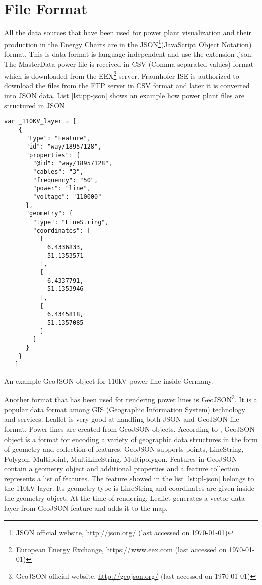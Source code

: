 \section{File Format}
\label{sec:fileFormat}

All the data sources that have been used for power plant visualization and their production in the Energy Charts are in the JSON\footnote{JSON official website, \url{http://json.org/} (last accessed on {\today})}(JavaScript Object Notation) format. This is data format is language-independent and use the extension .json. The MasterData power file is received in CSV (Comma-separated values) format which is downloaded from the EEX\footnote{European Energy Exchange, \url{https://www.eex.com} (last accessed on {\today})} server. Fraunhofer ISE is authorized to download the files from the FTP server in CSV format and later it is converted into JSON data. List \ref{lst:pp-json} shows an example how power plant files are structured in JSON. 

\begin{Listing}
\begin{lstlisting}
var _110KV_layer = [
    {
      "type": "Feature",
      "id": "way/18957128",
      "properties": {
        "@id": "way/18957128",
        "cables": "3",
        "frequency": "50",
        "power": "line",
        "voltage": "110000"
      },
      "geometry": {
        "type": "LineString",
        "coordinates": [
          [
            6.4336833,
            51.1353571
          ],
          [
            6.4337791,
            51.1353946
          ],
          [
            6.4345818,
            51.1357085
          ]
        ]
      }
    }
   ]
\end{lstlisting}
\caption{An example GeoJSON-object for 110kV power line inside Germany.}
\label{lst:pl-json}
\end{Listing}

Another format that has been used for rendering power lines is GeoJSON\footnote{GeoJSON official website, \url{http://geojson.org/} (last accessed on {\today})}. It is a popular data format among GIS (Geographic Information System) technology and services. Leaflet is very good at handling both JSON and GeoJSON file format. Power lines are created from GeoJSON objects. According to \cite{geojson16}, GeoJSON object is a format for encoding a variety of geographic data structures in the form of geometry and collection of features. GeoJSON supports points, LineString, Polygon, Multipoint, MultiLineString, Multipolygon. Features in GeoJSON contain a geometry object and additional properties and a feature collection represents a list of features. The feature showed in the list \ref{lst:pl-json} belongs to the 110kV layer. Its geometry type is LineString and coordinates are given inside the geometry object. At the time of rendering, Leaflet generates a vector data layer from GeoJSON feature and adds it to the map.

